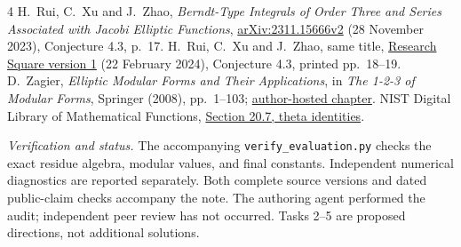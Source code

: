 \documentclass[11pt]{article}
\begin{document}
\begin{thebibliography}{4}
 H.~Rui, C.~Xu and J.~Zhao,
\emph{Berndt-Type Integrals of Order Three and Series Associated with
Jacobi Elliptic Functions},
\href{https://arxiv.org/abs/2311.15666v2}{arXiv:2311.15666v2}
(28 November 2023), Conjecture 4.3, p.~17.
 H.~Rui, C.~Xu and J.~Zhao, same title,
\href{https://doi.org/10.21203/rs.3.rs-3969711/v1}{Research Square version 1}
(22 February 2024), Conjecture 4.3, printed pp.~18--19.
 D.~Zagier, \emph{Elliptic Modular Forms and Their Applications},
in \emph{The 1-2-3 of Modular Forms}, Springer (2008), pp.~1--103;
\href{https://people.mpim-bonn.mpg.de/zagier/files/doi/10.1007/978-3-540-74119-0_1/fulltext.pdf}{author-hosted chapter}.
 NIST Digital Library of Mathematical Functions,
\href{https://dlmf.nist.gov/20.7}{Section 20.7, theta identities}.
\end{thebibliography}
\noindent\textit{Verification and status.}
The accompanying \texttt{verify\_evaluation.py} checks the exact
residue algebra, modular values, and final constants. Independent
numerical diagnostics are reported separately. Both complete source
versions and dated public-claim checks accompany the note. The
authoring agent performed the audit; independent peer review has not
occurred. Tasks 2--5 are proposed directions, not additional solutions.
\end{document}
